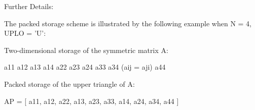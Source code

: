\begin{DoxyParagraph}{Further Details\+: }
\begin{DoxyVerb}  The packed storage scheme is illustrated by the following example
  when N = 4, UPLO = 'U':

  Two-dimensional storage of the symmetric matrix A:

     a11 a12 a13 a14
         a22 a23 a24
             a33 a34     (aij = aji)
                 a44

  Packed storage of the upper triangle of A:

  AP = [ a11, a12, a22, a13, a23, a33, a14, a24, a34, a44 ]\end{DoxyVerb}
 
\end{DoxyParagraph}
